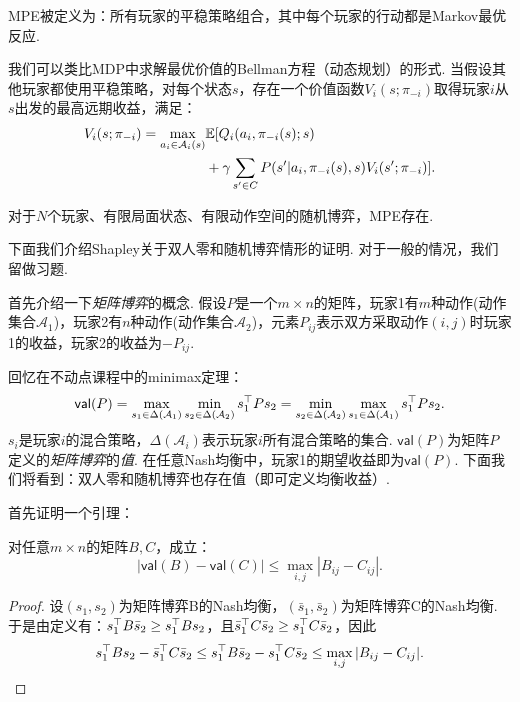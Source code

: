 MPE被定义为：所有玩家的平稳策略组合，其中每个玩家的行动都是Markov最优反应. 

我们可以类比MDP中求解最优价值的Bellman方程（动态规划）的形式. 当假设其他玩家都使用平稳策略，对每个状态$s$，存在一个价值函数$V_i(s;\pi_{-i})$取得玩家$i$从$s$出发的最高远期收益，满足：
\begin{align*}
    V_i(s;\pi_{-i}) = \max_{a_i\in \mathcal A_i(s)}&\mathbb{E}[Q_i(a_i,\pi_{-i}(s);s) \\ &+ \gamma \sum_{s'\in C}P(s'|a_i,\pi_{-i}(s),s)V_i(s';\pi_{-i})].
\end{align*}

\begin{theorem}
    对于$N$个玩家、有限局面状态、有限动作空间的随机博弈，MPE存在.
\end{theorem}

下面我们介绍Shapley关于双人零和随机博弈情形的证明. 对于一般的情况，我们留做习题.

\newcommand{\val}{\mathsf{val}}
首先介绍一下\emph{矩阵博弈}的概念. 假设$P$是一个$m\times n$的矩阵，玩家1有$m$种动作(动作集合$\mathcal A_1$)，玩家2有$n$种动作(动作集合$\mathcal A_2$)，元素$P_{ij}$表示双方采取动作$(i,j)$时玩家1的收益，玩家2的收益为$-P_{ij}$. 

回忆在不动点课程中的minimax定理：
\[\val(P)=\max_{s_1\in \Delta(\mathcal A_1)}\min_{s_2\in\Delta(\mathcal A_2)}s_1^\T Ps_2=\min_{s_2\in \Delta(\mathcal A_2)}\max_{s_1\in\Delta(\mathcal A_1)}s_1^\T Ps_2.\]
$s_i$是玩家$i$的混合策略，$\Delta(\mathcal A_i)$表示玩家$i$所有混合策略的集合. $\val(P)$为矩阵$P$定义的\emph{矩阵博弈}的\emph{值}. 在任意Nash均衡中，玩家1的期望收益即为$\val(P)$. 下面我们将看到：双人零和随机博弈也存在值（即可定义均衡收益）.

首先证明一个引理：
\begin{lemma}\label{lemma:matrix}
    对任意$m\times n$的矩阵$B,C$，成立：
    \[|\val(B)-\val(C)| \leq \max_{i,j}|B_{ij} - C_{ij}|.\]
\end{lemma}

\begin{proof}
    设$(s_1,s_2)$为矩阵博弈B的Nash均衡，$(\bar{s}_1,\bar{s}_2)$为矩阵博弈C的Nash均衡. 于是由定义有：$s_1^\top B\bar{s}_2  \geq s_1^\top  B s_2$，且$\bar{s}_1 ^\top  C\bar{s}_2 \geq s_1^\top  C \bar{s}_2 $，因此
    \[s_1^\top  B s_2 - \bar{s}_1 ^\top  C\bar{s}_2  \leq s_1^\top  B\bar{s}_2  - s_1^\top  C \bar{s}_2  \leq \max_{i,j}|B_{ij} - C_{ij}|.\]
\end{proof}

